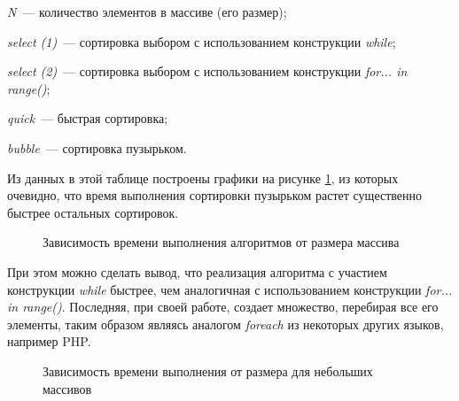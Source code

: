 \documentclass[
	12pt,
	paper=A4,
	oneside,
	draft
]{scrreprt}
\begin{document}
\textit{N}~--- количество элементов в массиве (его размер);

\textit{select (1)}~--- сортировка выбором с использованием конструкции \textit{while};

\textit{select (2)}~--- сортировка выбором с использованием конструкции \textit{for... in range()};

\textit{quick}~--- быстрая сортировка;

\textit{bubble}~--- сортировка пузырьком.
\bigskip

Из данных в этой таблице построены графики на рисунке \ref{fig:Sort}, из которых очевидно, что время выполнения сортировки пузырьком растет существенно быстрее остальных сортировок.

\begin{figure}[hb]
\centering
{}
\caption{Зависимость времени выполнения алгоритмов от размера массива} \label{fig:Sort}
\end{figure}

При этом можно сделать вывод, что реализация алгоритма с участием конструкции \textit{while} быстрее, чем аналогичная с использованием конструкции \textit{for... in range()}. Последняя, при своей работе, создает множество, перебирая все его элементы, таким образом являясь аналогом \textit{foreach} из некоторых других языков, например PHP.

\begin{figure}[hb]
\centering
{}
\caption{Зависимость времени выполнения от размера для небольших массивов} \label{fig:SortSmall}
\end{figure}
\end{document}
